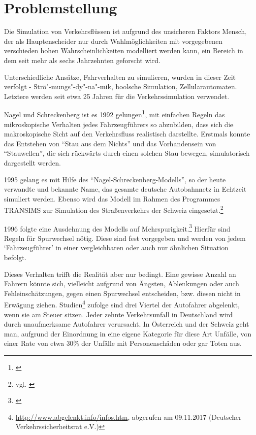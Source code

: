 \section{Problemstellung}
\label{sec:problemstellung}


Die Simulation von Verkehrsflüssen ist aufgrund des unsicheren Faktors Mensch, der als Hauptenscheider nur durch Wahlmöglichkeiten mit vorgegebenen verschieden hohen Wahrscheinlichkeiten modelliert werden kann, ein Bereich in dem seit mehr als sechs Jahrzehnten geforscht wird.

Unterschiedliche Ansätze, Fahrverhalten zu simulieren, wurden in dieser Zeit verfolgt - Strö"-mungs"-dy"-na"-mik, boolsche Simulation, Zellularautomaten. Letztere werden seit etwa 25 Jahren für die Verkehrssimulation verwendet.

Nagel und Schreckenberg ist es 1992 gelungen\footnote{\cite{na-sch}}, mit einfachen Regeln das mikroskopische Verhalten jedes Fahrzeugführers so abzubilden, dass sich die makroskopische Sicht auf den Verkehrsfluss realistisch darstellte.
Erstmals konnte das Entstehen von \enquote{Stau aus dem Nichts} und das Vorhandensein von \enquote{Stauwellen}, die sich rückwärts durch einen solchen Stau bewegen, simulatorisch dargestellt werden.

1995 gelang es mit Hilfe des \enquote{Nagel-Schreckenberg-Modells}, so der heute verwandte und bekannte Name, das gesamte deutsche Autobahnnetz in Echtzeit simuliert werden. 
Ebenso wird das Modell im Rahmen des Programmes TRANSIMS zur Simulation des Straßenverkehrs der Schweiz eingesetzt.\footnote{vgl. \cite{spahn-da}}

1996 folgte eine Ausdehnung des Modells auf Mehrspurigkeit.\footnote{\cite{multi-lane}} 
Hierfür sind Regeln für Spurwechsel nötig.
Diese sind fest vorgegeben und werden von jedem \enquote*{Fahrzeugführer} in einer vergleichbaren oder auch nur ähnlichen Situation befolgt.

Dieses Verhalten trifft die Realität aber nur bedingt.
Eine gewisse Anzahl an Fahrern könnte sich, vielleicht aufgrund von Ängsten, Ablenkungen oder auch Fehleinschätzungen, gegen einen Spurwechsel entscheiden, bzw. diesen nicht in Erwägung ziehen.
Studien\footnote{\url{http://www.abgelenkt.info/infos.htm}, abgerufen am 09.11.2017 (Deutscher Verkehrssicherheitsrat e.V.)} zufolge sind drei Viertel der Autofahrer abgelenkt, wenn sie am Steuer sitzen. 
Jeder zehnte Verkehrsunfall in Deutschland wird durch unaufmerksame Autofahrer verursacht. 
In Österreich und der Schweiz geht man, aufgrund der Einordnung in eine eigene Kategorie für diese Art Unfälle, von einer Rate von etwa 30\% der Unfälle mit Personenschäden oder gar Toten aus.

